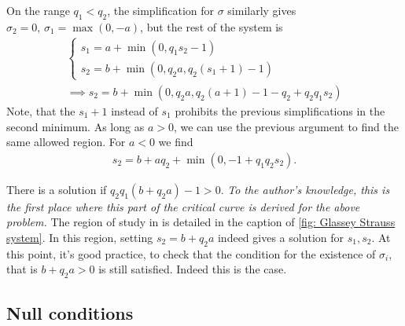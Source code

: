 \documentclass[11pt, oneside]{amsart}
\begin{document}
	On the range $q_1<q_2$, the simplification for $\sigma$ similarly gives $\sigma_2=0,\,\sigma_1=\max(0,-a)$, but the rest of the system is
	\begin{equation*}
		\begin{gathered}
			\begin{cases}
				s_1=a+\min(0,q_1s_2-1)\\
				s_2=b+\min(0,q_2a,q_2(s_1+1)-1)
			\end{cases}\\
			\implies s_2=b+\min(0,q_2a,q_2(a+1)-1-q_2+q_2q_1s_2)
		\end{gathered}
	\end{equation*}
	Note, that the $s_1+1$ instead of $s_1$ prohibits the previous simplifications in the second minimum. As long as $a>0$, we can use the previous argument to find the same allowed region. For $a<0$ we find
	\begin{equation*}
		\begin{gathered}
			s_2=b+aq_2+\min(0,-1+q_1q_2s_2).
		\end{gathered}
	\end{equation*}
	
	There is a solution if  $q_2q_1(b+q_2a)-1>0$. \textit{To the author's knowledge, this is the first place where this part of the critical curve is derived for the above problem.} The region of study in \cite{hidano_combined_2016} is detailed in the caption of \cref{fig: Glassey Strauss system}. In this region, setting $s_2=b+q_2a$ indeed gives a solution for $s_1,s_2$. At this point, it's good practice, to check that the condition for the existence of $\sigma_i$, that is $b+q_2a>0$ is still satisfied. Indeed this is the case.


	\begin{figure}[h]
	\end{figure}
	
	\subsection{Null conditions}\label{null condition}
	
\end{document}
